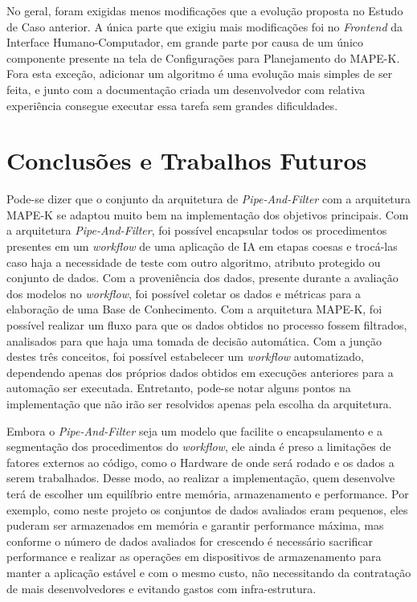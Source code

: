 \documentclass{article}
\begin{document}
No geral, foram exigidas menos modificações que a evolução proposta no Estudo de Caso anterior. A única parte que exigiu mais modificações foi no \textit{Frontend} da Interface Humano-Computador, em grande parte por causa de um único componente presente na tela de Configurações para Planejamento do MAPE-K. Fora esta exceção, adicionar um algoritmo é uma evolução mais simples de ser feita, e junto com a documentação criada um desenvolvedor com relativa experiência consegue executar essa tarefa sem grandes dificuldades.

\section{Conclusões e Trabalhos Futuros}

Pode-se dizer que o conjunto da arquitetura de \textit{Pipe-And-Filter} com a arquitetura MAPE-K se adaptou muito bem na implementação dos objetivos principais. Com a arquitetura \textit{Pipe-And-Filter}, foi possível encapsular todos os procedimentos presentes em um \textit{workflow} de uma aplicação de IA em etapas coesas e trocá-las caso haja a necessidade de teste com outro algoritmo, atributo protegido ou conjunto de dados. Com a proveniência dos dados, presente durante a avaliação dos modelos no \textit{workflow}, foi possível coletar os dados e métricas para a elaboração de uma Base de Conhecimento. Com a arquitetura MAPE-K, foi possível realizar um fluxo para que os dados obtidos no processo fossem filtrados, analisados para que haja uma tomada de decisão automática. Com a junção destes três conceitos, foi possível estabelecer um \textit{workflow} automatizado, dependendo apenas dos próprios dados obtidos em execuções anteriores para a automação ser executada. Entretanto, pode-se notar alguns pontos na implementação que não irão ser resolvidos apenas pela escolha da arquitetura.

Embora o \textit{Pipe-And-Filter} seja um modelo que facilite o encapsulamento e a segmentação dos procedimentos do \textit{workflow}, ele ainda é preso a limitações de fatores externos ao código, como o Hardware de onde será rodado e os dados a serem trabalhados. Desse modo, ao realizar a implementação, quem desenvolve terá de escolher um equilíbrio entre memória, armazenamento e performance. Por exemplo, como neste projeto os conjuntos de dados avaliados eram pequenos, eles puderam ser armazenados em memória e garantir performance máxima, mas conforme o número de dados avaliados for crescendo é necessário sacrificar performance e realizar as operações em dispositivos de armazenamento para manter a aplicação estável e com o mesmo custo, não necessitando da contratação de mais desenvolvedores e evitando gastos com infra-estrutura.
\end{document}
